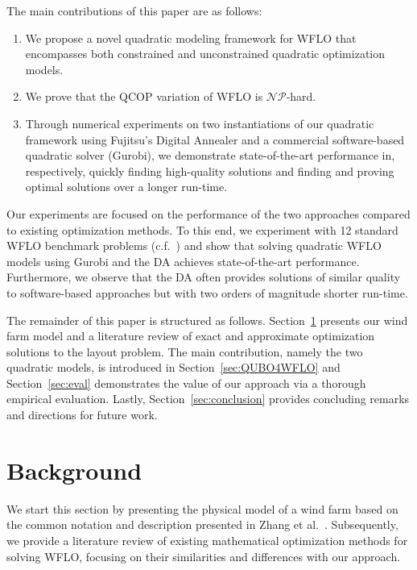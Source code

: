 \documentclass[preprint,12pt]{elsarticle}
\begin{document}
The main
contributions of this paper are as follows:
\begin{enumerate} 
\item We propose a novel quadratic modeling framework for WFLO that encompasses both constrained and unconstrained quadratic optimization models.
\item We prove that the QCOP variation of WFLO is $\mathcal{NP}$-hard.
\item Through numerical experiments on two instantiations of our quadratic framework using Fujitsu's Digital Annealer and a commercial software-based quadratic solver (Gurobi), we demonstrate state-of-the-art performance in, respectively, quickly finding high-quality solutions and finding and proving optimal solutions over a longer run-time.
\end{enumerate}

Our experiments are focused on the performance of the two approaches
compared to 
existing optimization methods. To this end,
we experiment with 12 standard WFLO benchmark problems (c.f.~\cite{turner2014new})
and show that solving quadratic WFLO models
using Gurobi and the DA
achieves state-of-the-art performance.
Furthermore, we observe that the DA often provides solutions of
similar quality to software-based approaches but with two orders of
magnitude shorter run-time.

The remainder of this paper is structured as follows. Section~\ref{sec:related} presents our wind farm model and a literature review of exact and approximate
optimization solutions to the layout problem. The main contribution, namely the two quadratic models, is introduced in Section~\ref{sec:QUBO4WFLO} and Section~\ref{sec:eval} demonstrates the value of our approach via a thorough empirical evaluation.
Lastly, Section~\ref{sec:conclusion} provides concluding remarks and directions for future work.   


\section{Background}
\label{sec:related}

We start this section by presenting the physical model of a wind farm
based on the common
notation and description presented in Zhang et al.\ \cite{Zhang2014}.  Subsequently,
we provide a literature review of existing mathematical optimization
methods for solving WFLO, focusing on their similarities and
differences with our approach.
 
\end{document}
